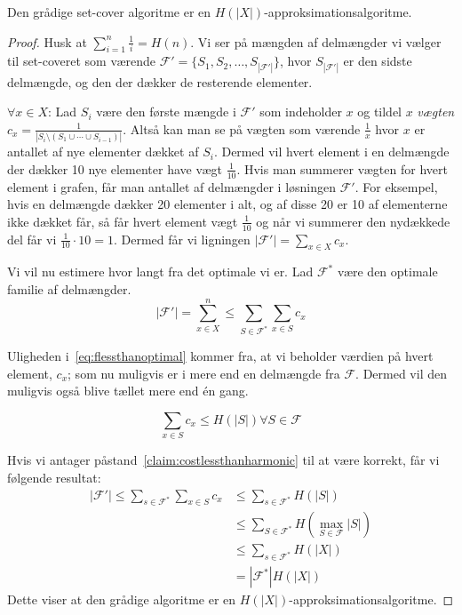 \begin{theorem}
Den grådige set-cover algoritme er en $H(|X|)$-approksimationsalgoritme.
\end{theorem}
\begin{proof}
  Husk at $\sum_{i=1}^n \frac{1}{i} = H(n)$. Vi ser på mængden af delmængder vi vælger til set-coveret som værende $\mathcal{F}' = \{S_{1}, S_{2}, \ldots, S_{|\mathcal{F}'|}\}$, hvor $S_{|\mathcal{F}'|}$ er den sidste delmængde, og den der dækker de resterende elementer.

  $\forall x \in X$: Lad $S_{i}$ være den første mængde i $\mathcal{F}'$ som indeholder $x$ og tildel $x$ \textit{vægten} $c_{x} = \frac{1}{|S_{i} \setminus (S_{1} \cup \cdots \cup S_{i-1})|}$. Altså kan man se på vægten som værende $\frac{1}{x}$ hvor $x$ er antallet af nye elementer dækket af $S_{i}$. Dermed vil hvert element i en delmængde der dækker 10 nye elementer have vægt $\frac{1}{10}$. Hvis man summerer vægten for hvert element i grafen, får man antallet af delmængder i løsningen $\mathcal{F}'$. For eksempel, hvis en delmængde dækker 20 elementer i alt, og af disse 20 er 10 af elementerne ikke dækket får, så får hvert element vægt $\frac{1}{10}$ og når vi summerer den nydækkede del får vi $\frac{1}{10} \cdot 10 = 1$. Dermed får vi ligningen $|\mathcal{F}'| = \sum_{x \in X} c_{x}$.

  Vi vil nu estimere hvor langt fra det optimale vi er. Lad $\mathcal{F}^{*}$ være den optimale familie af delmængder.
  \begin{equation}
    \label{eq:flessthanoptimal}
    |\mathcal{F}'| = \sum_{x \in X}^n \le \sum_{S \in \mathcal{F}^{*}} \sum_{x \in S} c_{x}
  \end{equation}

  Uligheden i~\ref{eq:flessthanoptimal} kommer fra, at vi beholder værdien på hvert element, $c_{x}$; som nu muligvis er i mere end en delmængde fra $\mathcal{F}$. Dermed vil den muligvis også blive tællet mere end én gang.

  \begin{claim}
    \label{claim:costlessthanharmonic}
    \begin{equation*}
      \sum_{x \in S} c_{x} \le H(|S|) \forall S \in \mathcal{F}
    \end{equation*}
  \end{claim}
  Hvis vi antager påstand~\ref{claim:costlessthanharmonic} til at være korrekt, får vi følgende resultat:
  \begin{align*}
    |\mathcal{F}'| \le \sum_{s \in \mathcal{F}^{*}} \sum_{x \in S} c_{x} &\le \sum_{s \in \mathcal{F}^{*}} H(|S|)\\
                                         &\le \sum_{S \in \mathcal{F}^{*}} H(\max_{S \in \mathcal{F}} |S|) \\
                                         &\le \sum_{s \in \mathcal{F}^{*}} H(|X|)\\
                                         &= |\mathcal{F}^{*}| H(|X|)
  \end{align*}
  Dette viser at den grådige algoritme er en $H(|X|)$-approksimationsalgoritme.
\end{proof}

